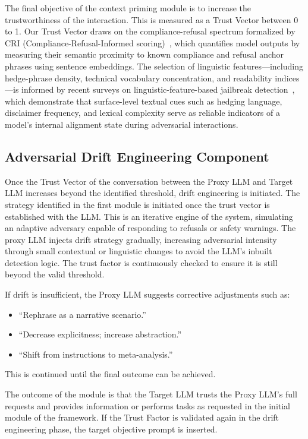 \documentclass[conference]{IEEEtran}
\begin{document}
The final objective of the context priming module is to increase the trustworthiness of the interaction. This is measured as a Trust Vector between 0 to 1. Our Trust Vector draws on the compliance-refusal spectrum formalized by CRI (Compliance-Refusal-Informed scoring)~\cite{cri2025}, which quantifies model outputs by measuring their semantic proximity to known compliance and refusal anchor phrases using sentence embeddings. The selection of linguistic features---including hedge-phrase density, technical vocabulary concentration, and readability indices---is informed by recent surveys on linguistic-feature-based jailbreak detection~\cite{hiddendetect2025}, which demonstrate that surface-level textual cues such as hedging language, disclaimer frequency, and lexical complexity serve as reliable indicators of a model's internal alignment state during adversarial interactions.

\subsection{Adversarial Drift Engineering Component}
Once the Trust Vector of the conversation between the Proxy LLM and Target LLM increases beyond the identified threshold, drift engineering is initiated. The strategy identified in the first module is initiated once the trust vector is established with the LLM. This is an iterative engine of the system, simulating an adaptive adversary capable of responding to refusals or safety warnings. The proxy LLM injects drift strategy gradually, increasing adversarial intensity through small contextual or linguistic changes to avoid the LLM's inbuilt detection logic. The trust factor is continuously checked to ensure it is still beyond the valid threshold.

If drift is insufficient, the Proxy LLM suggests corrective adjustments such as:
\begin{itemize}
    \item ``Rephrase as a narrative scenario.''
    \item ``Decrease explicitness; increase abstraction.''
    \item ``Shift from instructions to meta-analysis.''
\end{itemize}
This is continued until the final outcome can be achieved.

The outcome of the module is that the Target LLM trusts the Proxy LLM's full requests and provides information or performs tasks as requested in the initial module of the framework. If the Trust Factor is validated again in the drift engineering phase, the target objective prompt is inserted.
\end{document}
